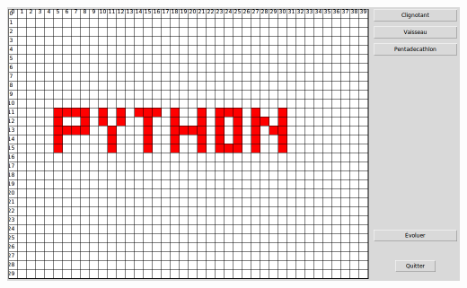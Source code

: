 \documentclass[11pt,class=report,crop=false]{standalone}
\begin{document}
\begin{activite}[Itérations]
\begin{enumerate}
\begin{center}
\includegraphics[scale=0.3]{ecran-vie-4b}
\end{center}

    
\end{enumerate}
\end{activite} 
\end{document}

